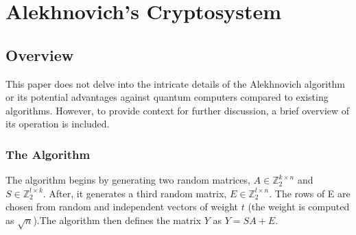 \chapter{Alekhnovich's Cryptosystem}

\section{Overview}
This paper does not delve into the intricate details of the Alekhnovich algorithm or its potential advantages against quantum computers compared to existing algorithms. However, to provide context for further discussion, a brief overview of its operation is included.

\subsection{The Algorithm} The algorithm begins by generating two random matrices, $A\in \mathbb{Z}^{k\times n}_2$ and $S\in \mathbb{Z}^{l\times k}_2$. After, it generates a third random matrix, $E\in \mathbb{Z}^{l\times n}_2$. The rows of E are chosen from random and independent vectors of weight $t$ (the weight is computed as $\sqrt{n}$).The algorithm then defines the matrix $Y$ as $Y = SA + E$.


